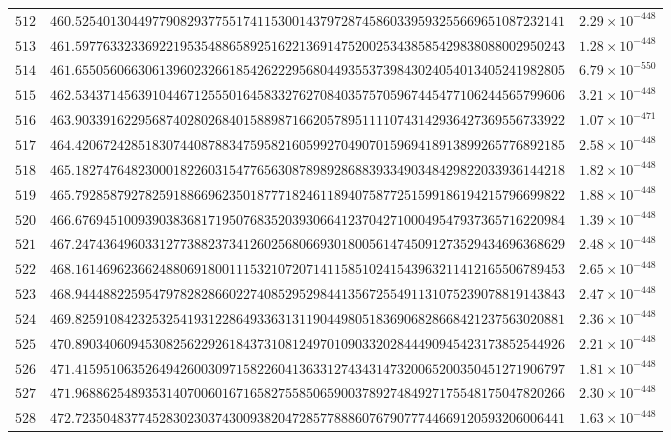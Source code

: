 \documentclass[12pt,reqno]{amsart}
\theoremstyle{remark}
\begin{document}
\begin{longtable}{clc}
$512$ & $460.5254013044977908293775517411530014379728745860339593255669651087232141$ & $2.29\times 10^{-448}$ \\
$513$ & $461.5977633233692219535488658925162213691475200253438585429838088002950243$ & $1.28\times 10^{-448}$ \\
$514$ & $461.6550560663061396023266185426222956804493553739843024054013405241982805$ & $6.79\times 10^{-550}$ \\
$515$ & $462.5343714563910446712555016458332762708403575705967445477106244565799606$ & $3.21\times 10^{-448}$ \\
$516$ & $463.9033916229568740280268401588987166205789511110743142936427369556733922$ & $1.07\times 10^{-471}$ \\
$517$ & $464.4206724285183074408788347595821605992704907015969418913899265776892185$ & $2.58\times 10^{-448}$ \\
$518$ & $465.1827476482300018226031547765630878989286883933490348429822033936144218$ & $1.82\times 10^{-448}$ \\
$519$ & $465.7928587927825918866962350187771824611894075877251599186194215796699822$ & $1.88\times 10^{-448}$ \\
$520$ & $466.6769451009390383681719507683520393066412370427100049547937365716220984$ & $1.39\times 10^{-448}$ \\
$521$ & $467.2474364960331277388237341260256806693018005614745091273529434696368629$ & $2.48\times 10^{-448}$ \\
$522$ & $468.1614696236624880691800111532107207141158510241543963211412165506789453$ & $2.65\times 10^{-448}$ \\
$523$ & $468.9444882259547978282866022740852952984413567255491131075239078819143843$ & $2.47\times 10^{-448}$ \\
$524$ & $469.8259108423253254193122864933631311904498051836906828668421237563020881$ & $2.36\times 10^{-448}$ \\
$525$ & $470.8903406094530825622926184373108124970109033202844490945423173852544926$ & $2.21\times 10^{-448}$ \\
$526$ & $471.4159510635264942600309715822604136331274343147320065200350451271906797$ & $1.81\times 10^{-448}$ \\
$527$ & $471.9688625489353140700601671658275585065900378927484927175548175047820266$ & $2.30\times 10^{-448}$ \\
$528$ & $472.7235048377452830230374300938204728577888607679077744669120593206006441$ & $1.63\times 10^{-448}$ \\

\end{longtable}
\end{document}
